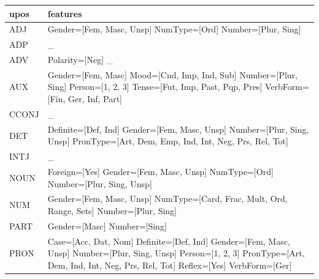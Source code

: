 \documentclass[output=paper,colorlinks,citecolor=brown]{langscibook}
\begin{document}
\begin{longtable}{ p{1.5cm} | p{10cm} }

\textbf{upos} & \textbf{features} \\\hline
ADJ & Gender=[Fem, Masc, Unsp] \newline NumType=[Ord] \newline Number=[Plur, Sing] \newline \\
ADP & \_ \newline\\
ADV & Polarity=[Neg] \newline \_ \newline \\
AUX & Gender=[Fem, Masc] \newline Mood=[Cnd, Imp, Ind, Sub] \newline Number=[Plur, Sing] \newline Person=[1, 2, 3] \newline Tense=[Fut, Imp, Past, Pqp, Pres] \newline VerbForm=[Fin, Ger, Inf, Part] \newline \\
CCONJ & \_ \newline\\
DET & Definite=[Def, Ind] \newline Gender=[Fem, Masc, Unsp] \newline Number=[Plur, Sing, Unsp] \newline PronType=[Art, Dem, Emp, Ind, Int, Neg, Prs, Rel, Tot] \newline \\
INTJ & \_ \newline\\
NOUN & Foreign=[Yes] \newline Gender=[Fem, Masc, Unsp] \newline NumType=[Ord] \newline Number=[Plur, Sing, Unsp] \newline \\
NUM & Gender=[Fem, Masc, Unsp] \newline NumType=[Card, Frac, Mult, Ord, Range, Sets] \newline Number=[Plur, Sing] \newline \\
PART & Gender=[Masc] \newline Number=[Sing] \newline \\
PRON & Case=[Acc, Dat, Nom] \newline Definite=[Def, Ind] \newline Gender=[Fem, Masc, Unsp] \newline Number=[Plur, Sing, Unsp] \newline Person=[1, 2, 3] \newline PronType=[Art, Dem, Ind, Int, Neg, Prs, Rel, Tot] \newline Reflex=[Yes] \newline VerbForm=[Ger] \newline \\

\end{longtable}
\end{document}
